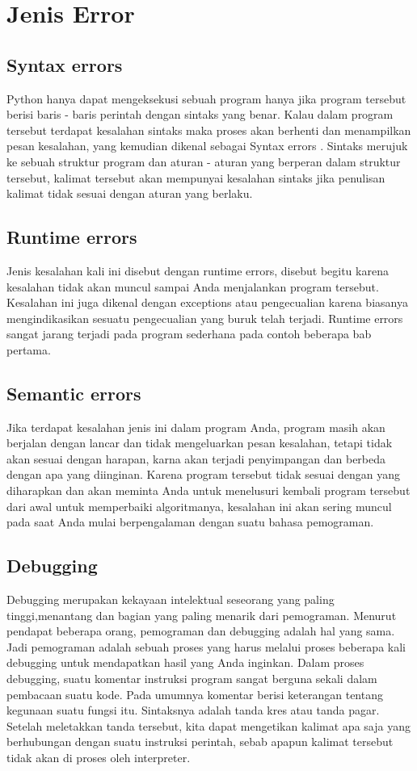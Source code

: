 \section{Jenis Error}
\subsection{Syntax errors}
Python hanya dapat mengeksekusi sebuah program hanya jika program tersebut
berisi baris - baris perintah dengan sintaks yang benar. Kalau dalam program tersebut terdapat kesalahan sintaks maka proses akan berhenti dan menampilkan 
pesan kesalahan, yang kemudian dikenal sebagai Syntax errors . Sintaks merujuk ke sebuah struktur program dan aturan - aturan yang berperan dalam struktur 
tersebut, kalimat tersebut akan mempunyai kesalahan sintaks jika penulisan kalimat tidak sesuai dengan aturan yang berlaku. 
\subsection{Runtime errors}
Jenis kesalahan kali ini disebut dengan runtime errors, disebut begitu karena kesalahan tidak akan muncul sampai Anda menjalankan program tersebut. Kesalahan ini juga dikenal dengan exceptions atau pengecualian karena biasanya mengindikasikan sesuatu pengecualian yang buruk telah terjadi. Runtime errors sangat jarang terjadi pada program sederhana pada contoh 
beberapa bab pertama.
\subsection{Semantic errors}
Jika terdapat kesalahan jenis ini dalam program Anda, program masih akan berjalan dengan lancar dan tidak mengeluarkan pesan kesalahan, tetapi tidak
akan sesuai dengan harapan, karna akan terjadi penyimpangan dan berbeda dengan 
apa yang diinginan. Karena program tersebut tidak sesuai dengan yang diharapkan dan akan meminta
Anda untuk menelusuri kembali program tersebut dari awal untuk memperbaiki
algoritmanya, kesalahan ini akan sering muncul pada saat Anda mulai berpengalaman dengan suatu bahasa pemograman.
\subsection{Debugging}
Debugging merupakan kekayaan intelektual seseorang yang paling tinggi,menantang dan bagian yang paling menarik dari pemograman. Menurut pendapat beberapa orang, pemograman dan debugging adalah hal yang
sama. Jadi pemograman adalah sebuah proses yang harus melalui proses beberapa kali debugging untuk mendapatkan hasil yang Anda inginkan. Dalam proses debugging, suatu komentar instruksi program sangat berguna sekali dalam pembacaan suatu kode. Pada umumnya komentar berisi keterangan tentang
kegunaan suatu fungsi itu. Sintaksnya adalah tanda kres atau tanda pagar. Setelah meletakkan tanda tersebut, kita dapat mengetikan kalimat apa saja yang
berhubungan dengan suatu instruksi perintah, sebab apapun kalimat tersebut tidak
akan di proses oleh interpreter. 
